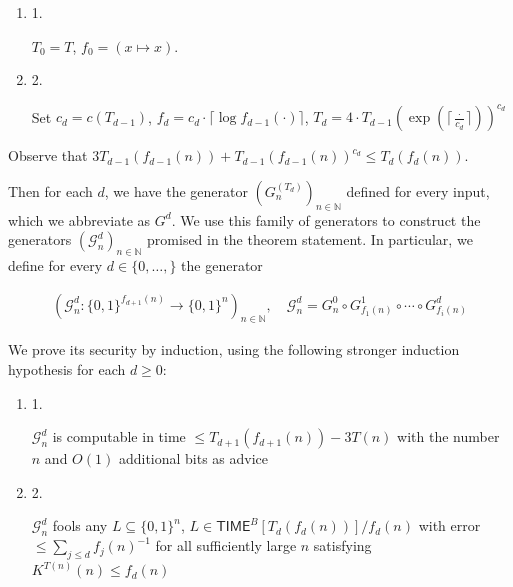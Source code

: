 \documentclass[10pt,a4paper]{article}
\begin{document}
\begin{enumerate}


\item[] 
1. 


$T_{0}=T$, $f_{0}=(x\mapsto x)$.\par





\item[] 
2. 


Set $c_{d}=c(T_{d-1})$, $f_{d}=c_{d}\cdot\lceil\log f_{d-1}(\cdot)\rceil$, $T_{d}=4\cdot T_{d-1}(\exp(\lceil\frac{\cdot}{c_{d}}\rceil))^{c_{d}}$\par





\end{enumerate}


Observe that $3T_{d-1}(f_{d-1}(n))+T_{d-1}(f_{d-1}(n))^{c_{d}}\leq T_{d}(f_{d}(n))$.\par




Then for each $d$, we have the generator $(G_{n}^{(T_{d})})_{n\in\mathbb{N}}$ defined for every input, which we abbreviate as $G^{d}$. We use this family of generators to construct the generators $(\mathcal{G}^{d}_{n})_{n\in\mathbb{N}}$ promised in the theorem statement.
In particular, we define for every $d\in\{0,\ldots,\}$ the generator\par


\[\begin{gathered}
(\mathcal{G}^{d}_{n}:\{0,1\}^{f_{d+1}(n)}\to\{0,1\}^{n})_{n\in\mathbb{N}},\quad\mathcal{G}^{d}_{n}=G_{n}^{0}\circ G^{1}_{f_{1}(n)}\circ\cdots\circ G^{d}_{f_{i}(n)}
\end{gathered}\]




We prove its security by induction, using the following stronger induction hypothesis for each $d\geq 0$:\par


\begin{enumerate}


\item[] 
1. 


$\mathcal{G}^{d}_{n}$ is computable in time $\leq T_{d+1}(f_{d+1}(n))-3T(n)$ with the number $n$ and $O(1)$ additional bits as advice\par





\item[] 
2. 


$\mathcal{G}^{d}_{n}$ fools any $L\subseteq\{0,1\}^{n}$, $L\in{\mathsf{TIME}}^{B}[T_{d}(f_{d}(n))]/f_{d}(n)$ with error $\leq\sum_{j\leq d}f_{j}(n)^{-1}$ for all sufficiently large $n$ satisfying $K^{T(n)}(n)\leq f_{d}(n)$\par





\end{enumerate}
\end{document}
